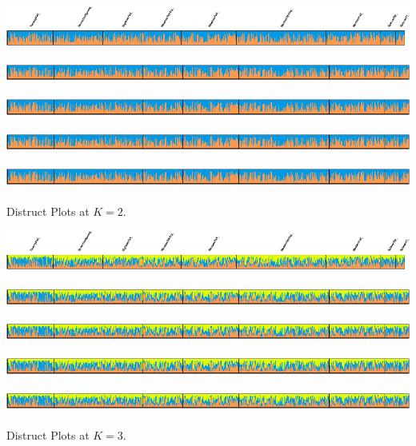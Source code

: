 \documentclass[11pt]{article}
\newlength{\nameraise}
\begin{document}
 
 
\includegraphics{./final_pdf//BB_ds_Clumped_TopLabel_k002r001.pdf}~\hspace{-1.1ex} \\
\includegraphics{./final_pdf//BB_ds_Clumped_NoLabel_k002r002.pdf}~ \\
\includegraphics{./final_pdf//BB_ds_Clumped_NoLabel_k002r003.pdf}~ \\
\includegraphics{./final_pdf//BB_ds_Clumped_NoLabel_k002r004.pdf}~ \\
\includegraphics{./final_pdf//BB_ds_Clumped_NoLabel_k002r005.pdf}~ \\
Distruct Plots at $K=2$.


\includegraphics{./final_pdf//BB_ds_Clumped_TopLabel_k003r001.pdf}~\hspace{-1.1ex} \\
\includegraphics{./final_pdf//BB_ds_Clumped_NoLabel_k003r002.pdf}~ \\
\includegraphics{./final_pdf//BB_ds_Clumped_NoLabel_k003r003.pdf}~ \\
\includegraphics{./final_pdf//BB_ds_Clumped_NoLabel_k003r004.pdf}~ \\
\includegraphics{./final_pdf//BB_ds_Clumped_NoLabel_k003r005.pdf}~ \\
Distruct Plots at $K=3$.
\end{document}
